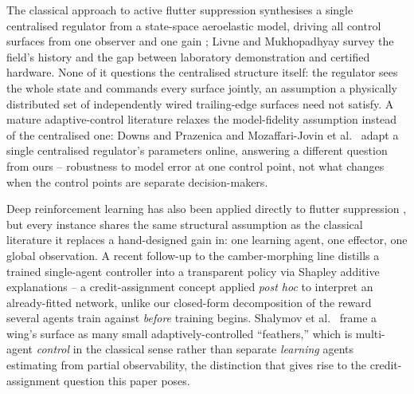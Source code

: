 \documentclass[journal]{new-aiaa}
\begin{document}
The classical approach to active flutter suppression synthesises a single
centralised regulator from a state-space aeroelastic model, driving all
control surfaces from one observer and one gain
\cite{karpel1982design,waszak2001robust,block1998applied}; Livne
\cite{livne2018flutter} and Mukhopadhyay \cite{mukhopadhyay2003historical}
survey the field's history and the gap between laboratory demonstration and
certified hardware. None of it questions the centralised structure itself:
the regulator sees the whole state and commands every surface jointly, an
assumption a physically distributed set of independently wired
trailing-edge surfaces need not satisfy. A mature adaptive-control
literature relaxes the model-fidelity assumption instead of the centralised
one: Downs and Prazenica \cite{downs2023adaptive} and Mozaffari-Jovin et
al.\ \cite{mozaffarijovin2024l1} adapt a single centralised regulator's
parameters online, answering a different question from ours -- robustness
to model error at one control point, not what changes when the control
points are separate decision-makers.

Deep reinforcement learning has also been applied directly to flutter
suppression \cite{stallflutter2025,circulation2023,flyingwing2022}, but
every instance shares the same structural assumption as the classical
literature it replaces a hand-designed gain in: one learning agent, one
effector, one global observation. A recent follow-up to the camber-morphing
line distills a trained single-agent controller into a transparent policy
via Shapley additive explanations \cite{shapley2026stallflutter} -- a
credit-assignment concept applied \emph{post hoc} to interpret an
already-fitted network, unlike our closed-form decomposition of the reward
several agents train against \emph{before} training begins. Shalymov et
al.\ \cite{shalymov2020feathers} frame a wing's surface as many small
adaptively-controlled ``feathers,'' which is multi-agent \emph{control} in
the classical sense rather than separate \emph{learning} agents estimating
from partial observability, the distinction that gives rise to the
credit-assignment question this paper poses.
\end{document}
